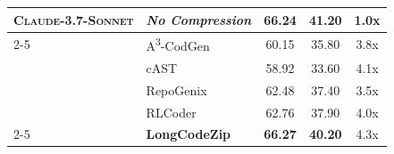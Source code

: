 \documentclass[10pt,conference]{IEEEtran}
\newcommand{\approach}{{LongCodeZip}\xspace} %
\begin{document}
\begin{table}[t]
{\begin{tabular}{llccc}
    \midrule
    \multirow{6}{*}{\textsc{Claude-3.7-Sonnet}} & \textit{No Compression} & 66.24 & 41.20 & 1.0x \\
    \cmidrule{2-5}
    & A\textsuperscript{3}-CodGen & 60.15 & 35.80 & 3.8x \\
    & cAST & 58.92 & 33.60 & 4.1x \\
    & RepoGenix & 62.48 & 37.40 & 3.5x \\
    & RLCoder & 62.76 & 37.90 & 4.0x \\
    \cmidrule(lr){2-5}
    & \cellcolor{cyan!10}\textbf{\approach} & \cellcolor{cyan!10}\textbf{66.27} & \cellcolor{cyan!10}\textbf{40.20} & \cellcolor{cyan!10}4.3x \\
    \bottomrule
    \end{tabular}
    }
\end{table}
\end{document}
